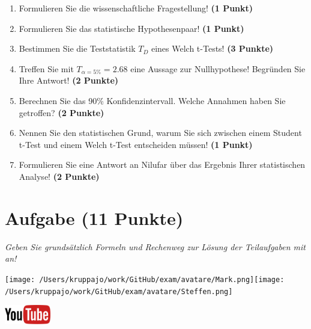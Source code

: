 \documentclass[a4paper, 9pt]{scrartcl}\usepackage[]{graphicx}\usepackage[]{xcolor}
\begin{document}
\begin{enumerate}
  \item Formulieren Sie die wissenschaftliche Fragestellung! \textbf{(1 Punkt)}
  \item Formulieren Sie das statistische Hypothesenpaar! \textbf{(1 Punkt)}
  \item Bestimmen Sie die Teststatistik $T_{D}$ eines  Welch t-Tests! \textbf{(3 Punkte)}
  \item Treffen Sie mit $T_{\alpha = 5\%} = 2.68$ eine Aussage zur Nullhypothese! Begründen Sie Ihre Antwort! \textbf{(2 Punkte)}
\item Berechnen Sie das 90\% Konfidenzintervall. Welche Annahmen haben Sie getroffen? \textbf{(2 Punkte)}
\item Nennen Sie den statistischen Grund, warum Sie sich zwischen einem Student t-Test und einem Welch t-Test entscheiden müssen! \textbf{(1 Punkt)}
\item Formulieren Sie eine Antwort an Nilufar über das Ergebnis Ihrer statistischen Analyse! \textbf{(2 Punkte)}
\end{enumerate} 
\clearpage

\section{Aufgabe \hfill (11 Punkte)}

\textit{Geben Sie grundsätzlich Formeln und Rechenweg zur Lösung der Teilaufgaben mit an!} \\[1Ex]
 

 
\begin{minipage}[t]{0.5\textwidth}
\texttt{[image: /Users/kruppajo/work/GitHub/exam/avatare/Mark.png]}\hspace{-4mm}\texttt{[image: /Users/kruppajo/work/GitHub/exam/avatare/Steffen.png]}
\end{minipage}
\begin{minipage}[t]{0.5\textwidth}
\hfill
\href{https://youtu.be/QR90zyn0Iz8}{\includegraphics[width = 2cm]{img/youtube}}
\end{minipage}
\vspace{1ex}
\end{document}
